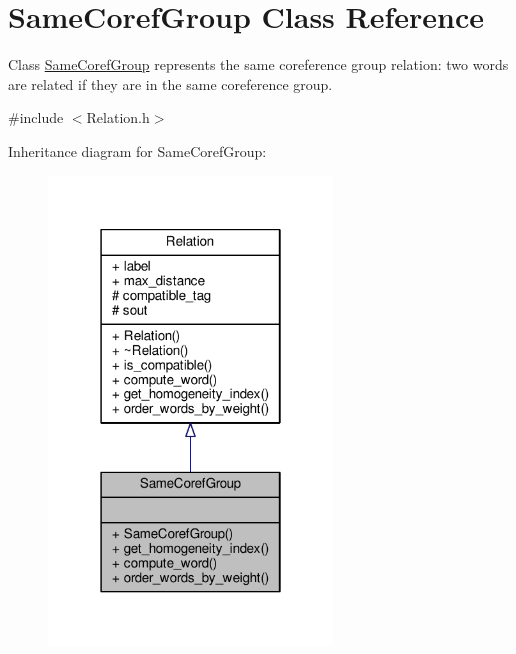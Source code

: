 \hypertarget{classSameCorefGroup}{}\section{Same\+Coref\+Group Class Reference}
\label{classSameCorefGroup}


Class \hyperlink{classSameCorefGroup}{Same\+Coref\+Group} represents the same coreference group relation\+: two words are related if they are in the same coreference group.  




{\ttfamily \#include $<$Relation.\+h$>$}



Inheritance diagram for Same\+Coref\+Group\+:\nopagebreak
\begin{figure}[H]
\begin{center}
\leavevmode
\includegraphics[width=214pt]{classSameCorefGroup__inherit__graph}
\end{center}
\end{figure}


